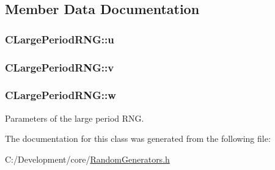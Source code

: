 \subsection{Member Data Documentation}
\hypertarget{class_c_large_period_r_n_g_a6255887a06808f9fe85a65ff86c8fd69}{
\subsubsection[{u}]{ C\-Large\-Period\-R\-N\-G\-::u\hspace{0.3cm}{\ttfamily [private]}}}\label{class_c_large_period_r_n_g_a6255887a06808f9fe85a65ff86c8fd69}
\hypertarget{class_c_large_period_r_n_g_a544988a3f0eaa81c2eacb9ac8b605c36}{
\subsubsection[{v}]{ C\-Large\-Period\-R\-N\-G\-::v\hspace{0.3cm}{\ttfamily [private]}}}\label{class_c_large_period_r_n_g_a544988a3f0eaa81c2eacb9ac8b605c36}
\hypertarget{class_c_large_period_r_n_g_ab26b2dfa899104bb2725f54397df314b}{
\subsubsection[{w}]{ C\-Large\-Period\-R\-N\-G\-::w\hspace{0.3cm}{\ttfamily [private]}}}\label{class_c_large_period_r_n_g_ab26b2dfa899104bb2725f54397df314b}


Parameters of the large period R\-N\-G. 



The documentation for this class was generated from the following file\-:\begin{DoxyCompactItemize}
\item 
C\-:/\-Development/core/\hyperlink{_random_generators_8h}{Random\-Generators.\-h}\end{DoxyCompactItemize}
